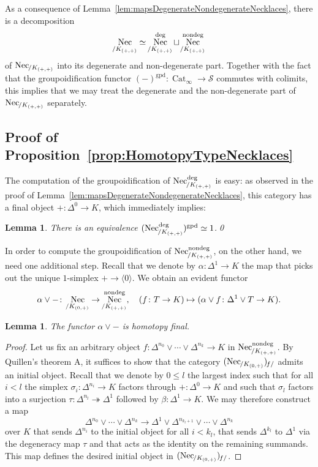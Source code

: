 \documentclass[reqno]{amsart}
\numberwithin{equation}{subsection}
\theoremstyle{plain}
\newtheorem{lemma}[equation]{Lemma}
\theoremstyle{definition}
\let\scr=\mathcal
\let\onto=\twoheadrightarrow
\def\SS{\scr S}
\DeclareMathOperator{\Cat}{Cat}
\DeclareMathOperator{\Nec}{Nec}
\newcommand{\gp}{\mathrm{gpd}}
\newcommand{\ord}[1]{\langle#1\rangle}
\newcommand{\Over}[2]{#1_{\hspace{-1pt}/#2}}
\newcommand{\Under}[2]{#1_{\hspace{-1pt}#2/}}
\newcommand{\CatS}{\Cat_{\infty}}
\begin{document}
As a consequence of Lemma~\ref{lem:mapsDegenerateNondegenerateNecklaces}, there is a decomposition
\begin{equation*}
\Over{\Nec}{K_{(+,+)}}\simeq \Over{\Nec}{K_{(+,+)}}^{\text{deg}}\sqcup\Over{\Nec}{K_{(+,+)}}^{\text{nondeg}}
\end{equation*}
of $\Over{\Nec}{K_{(+,+)}}$ into its degenerate and non-degenerate part. Together with the fact that the groupoidification functor $(-)^\gp\colon\CatS\to \SS$ commutes with colimits, this implies that we may treat the degenerate and the non-degenerate part of $\Over{\Nec}{K_{(+,+)}}$ separately.

\subsection{Proof of Proposition~\ref{prop:HomotopyTypeNecklaces}}
The computation of the groupoidification of $\Over{\Nec}{K_{(+,+)}}^{\text{deg}}$ is easy: as observed in the proof of Lemma~\ref{lem:mapsDegenerateNondegenerateNecklaces}, this category has a final object $+\colon \Delta^0\to K$, which immediately implies:
\begin{lemma}
	\label{lem:homotopyTypeDeg}
	There is an equivalence $(\Over{\Nec}{K_{(+,+)}}^{\mathrm{deg}})^\gp\simeq 1$.\qed
\end{lemma}
In order to compute the groupoidification of $\Over{\Nec}{K_{(+,+)}}^{\text{nondeg}}$, on the other hand, we need one additional step. Recall that we denote by $\alpha\colon \Delta^1\to K$ the map that picks out the unique $1$-simplex $+\to\ord{0}$. We obtain an evident functor
\begin{equation*}
\alpha\vee -\colon \Over{\Nec}{K_{(0,+)}}\to \Over{\Nec}{K_{(+,+)}}^{\mathrm{nondeg}},\quad (f\colon T\to K)\mapsto (\alpha\vee f\colon\Delta^1\vee T\to K).
\end{equation*}
\begin{lemma}
	\label{lem:precompositionNecklacesFinal}
	The functor $\alpha\vee -$ is homotopy final.
\end{lemma}
\begin{proof}
	Let us fix an arbitrary object $f\colon \Delta^{n_0}\vee\cdots\vee\Delta^{n_k}\to K$ in $\Over{\Nec}{K_{(+,+)}}^{\mathrm{nondeg}}$. By Quillen's theorem A, it suffices to show that the category $\Under{(\Over{\Nec}{K_{(0,+)}})}{f}$ admits an initial object. Recall that we denote by $0\leq l$ the largest index such that for all $i<l$ the simplex $\sigma_i\colon \Delta^{n_i}\to K$ factors through $+\colon\Delta^0\to K$ and such that $\sigma_l$ factors into a surjection $\tau\colon\Delta^{n_l}\onto\Delta^1$ followed by $\beta\colon\Delta^1\to K$. We may therefore construct a map
	\begin{equation*}
	\Delta^{n_0}\vee\cdots\vee\Delta^{n_k}\to \Delta^{1}\vee\Delta^{n_{k_l+1}}\vee\cdots\vee\Delta^{n_k}
	\end{equation*}
	over $K$ that sends $\Delta^{n_i}$ to the initial object for all $i< k_l$, that sends $\Delta^{k_l}$ to $\Delta^1$ via the degeneracy map $\tau$ and that acts as the identity on the remaining summands. This map defines the desired initial object in $\Under{(\Over{\Nec}{K_{(0,+)}})}{f}$.
\end{proof}
\end{document}
